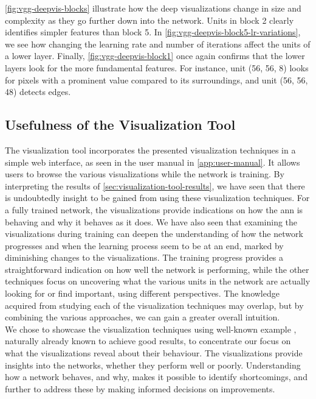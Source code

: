 \noindent \autoref{fig:vgg-deepvis-blocks} illustrate how the deep visualizations change in size and complexity as they go further down into the network. Units in block 2 clearly identifies simpler features than block 5. In \autoref{fig:vgg-deepvis-block5-lr-variations}, we see how changing the learning rate and number of iterations affect the units of a lower layer. Finally, \autoref{fig:vgg-deepvis-block1} once again confirms that the lower layers look for the more fundamental features. For instance, unit (56, 56, 8) looks for pixels with a prominent value compared to its surroundings, and unit (56, 56, 48) detects edges.

\subsection{Usefulness of the Visualization Tool}

The visualization tool incorporates the presented visualization techniques in a simple web interface, as seen in the user manual in \autoref{app:user-manual}. It allows users to browse the various visualizations while the network is training. By interpreting the results of \autoref{sec:visualization-tool-results}, we have seen that there is undoubtedly insight to be gained from using these visualization techniques. For a fully trained network, the visualizations provide indications on how the \acrshort{ann} is behaving and why it behaves as it does. We have also seen that examining the visualizations during training can deepen the understanding of how the network progresses and when the learning process seem to be at an end, marked by diminishing changes to the visualizations. The training progress provides a straightforward indication on how well the network is performing, while the other techniques focus on uncovering what the various units in the network are actually looking for or find important, using different perspectives. The knowledge acquired from studying each of the visualization techniques may overlap, but by combining the various approaches, we can gain a greater overall intuition. \\

\noindent We chose to showcase the visualization techniques using well-known example , naturally already known to achieve good results, to concentrate our focus on what the visualizations reveal about their behaviour. The visualizations provide insights into the networks, whether they perform well or poorly. Understanding how a network behaves, and why, makes it possible to identify shortcomings, and further to address these by making informed decisions on improvements. \\

